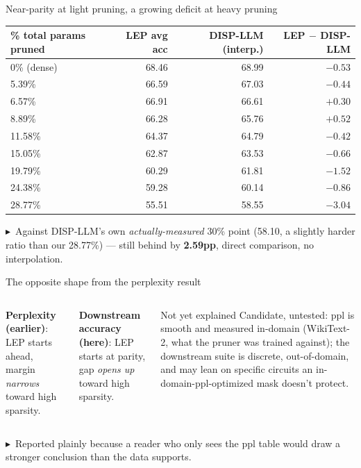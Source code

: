 \documentclass[10pt,aspectratio=169]{beamer}
\newcommand{\tk}[1]{{\scriptsize \textcolor{accent}{$\blacktriangleright$}\ #1}}
\begin{document}
\begin{frame}{Near-parity at light pruning, a growing deficit at heavy pruning}
  \begin{center}\scriptsize
  \begin{tabular}{@{}lrrr@{}}
    \toprule
    \% total params pruned & LEP avg acc & DISP-LLM (interp.) & LEP $-$ DISP-LLM \\
    \midrule
    0\% (dense) & 68.46 & 68.99 & $-0.53$ \\
    5.39\%      & 66.59 & 67.03 & $-0.44$ \\
    6.57\%      & 66.91 & 66.61 & $+0.30$ \\
    8.89\%      & 66.28 & 65.76 & $+0.52$ \\
    11.58\%     & 64.37 & 64.79 & $-0.42$ \\
    15.05\%     & 62.87 & 63.53 & $-0.66$ \\
    19.79\%     & 60.29 & 61.81 & $-1.52$ \\
    24.38\%     & 59.28 & 60.14 & $-0.86$ \\
    28.77\%     & 55.51 & 58.55 & $\mathbf{-3.04}$ \\
    \bottomrule
  \end{tabular}
  \end{center}
  \vspace{0.3em}
  \tk{Against DISP-LLM's own \emph{actually-measured} 30\% point (58.10, a slightly harder ratio than our 28.77\%) --- still behind by \textbf{2.59pp}, direct comparison, no interpolation.}
\end{frame}

\begin{frame}{The opposite shape from the perplexity result}
  \begin{columns}[T,onlytextwidth]
      \textbf{Perplexity (earlier)}: LEP starts ahead, margin \emph{narrows} toward high sparsity.
      \vspace{0.4em}

      \textbf{Downstream accuracy (here)}: LEP starts at parity, gap \emph{opens up} toward high sparsity.
      \begin{block}{Not yet explained}
        Candidate, untested: ppl is smooth and measured in-domain (WikiText-2, what the pruner was trained against); the downstream suite is discrete, out-of-domain, and may lean on specific circuits an in-domain-ppl-optimized mask doesn't protect.
      \end{block}
  \end{columns}
  \vspace{0.4em}
  \tk{Reported plainly because a reader who only sees the ppl table would draw a stronger conclusion than the data supports.}
\end{frame}
\end{document}
